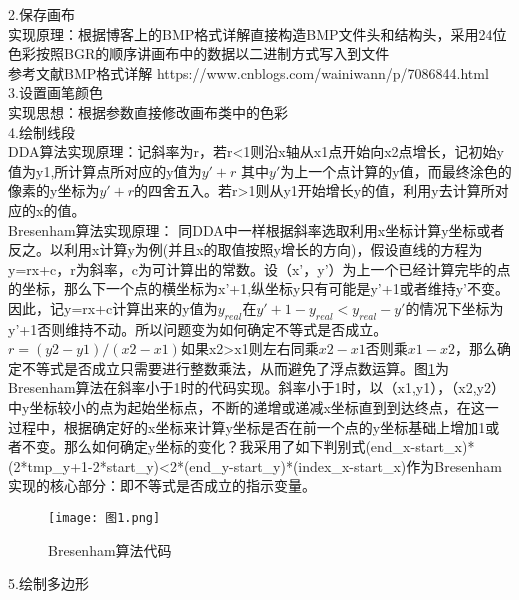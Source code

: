 \documentclass[a4paper,UTF8]{article}
\theoremstyle{definition}
\renewcommand\refname{参考文献}
\begin{document}
\noindent{}2.保存画布\\

\indent{}实现原理：根据博客上的BMP格式详解直接构造BMP文件头和结构头，采用24位色彩按照BGR的顺序讲画布中的数据以二进制方式写入到文件\\
\indent{}\refname{BMP格式详解 https://www.cnblogs.com/wainiwann/p/7086844.html}\\

\noindent{}3.设置画笔颜色\\

\indent{}实现思想：根据参数直接修改画布类中的色彩\\

\noindent{}4.绘制线段\\

\indent{}DDA算法实现原理：记斜率为r，若r<1则沿x轴从x1点开始向x2点增长，记初始y值为y1,所计算点所对应的y值为$y'+r$ 其中$y'$为上一个点计算的y值，而最终涂色的像素的y坐标为$y'+r$的四舍五入。若r>1则从y1开始增长y的值，利用y去计算所对应的x的值。\\
\indent{}Bresenham算法实现原理：
同DDA中一样根据斜率选取利用x坐标计算y坐标或者反之。以利用x计算y为例(并且x的取值按照y增长的方向)，假设直线的方程为y=rx+c，r为斜率，c为可计算出的常数。设（x'，y'）为上一个已经计算完毕的点的坐标，那么下一个点的横坐标为x'+1,纵坐标y只有可能是y'+1或者维持y'不变。因此，记y=rx+c计算出来的y值为$y_{real}$在$y'+1-y_{real}<y_{real}-y'$的情况下坐标为y'+1否则维持不动。所以问题变为如何确定不等式是否成立。$r=(y2-y1)/(x2-x1)$如果x2>x1则左右同乘$x2-x1$否则乘$x1-x2$，那么确定不等式是否成立只需要进行整数乘法，从而避免了浮点数运算。图\ref{fig:图1}为Bresenham算法在斜率小于1时的代码实现。斜率小于1时，以（x1,y1），（x2,y2）中y坐标较小的点为起始坐标点，不断的递增或递减x坐标直到到达终点，在这一过程中，根据确定好的x坐标来计算y坐标是否在前一个点的y坐标基础上增加1或者不变。那么如何确定y坐标的变化？我采用了如下判别式(end\_x-start\_x)*(2*tmp\_y+1-2*start\_y)<2*(end\_y-start\_y)*(index\_x-start\_x)作为Bresenham实现的核心部分：即不等式是否成立的指示变量。\\

\begin{figure}[htbp]
   \centering
   \texttt{[image: 图1.png]} %
   \caption{Bresenham算法代码}
   \label{fig:图1}
\end{figure}

\noindent{}5.绘制多边形\\
\end{document}
